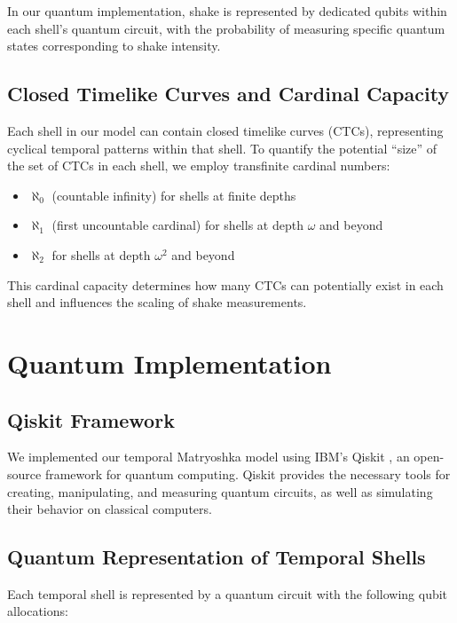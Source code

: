 \documentclass[12pt,a4paper]{article}
\begin{document}
In our quantum implementation, shake is represented by dedicated qubits within each shell's quantum circuit, with the probability of measuring specific quantum states corresponding to shake intensity.

\subsection{Closed Timelike Curves and Cardinal Capacity}

Each shell in our model can contain closed timelike curves (CTCs), representing cyclical temporal patterns within that shell. To quantify the potential ``size'' of the set of CTCs in each shell, we employ transfinite cardinal numbers:

\begin{itemize}
    \item $\aleph_0$ (countable infinity) for shells at finite depths
    \item $\aleph_1$ (first uncountable cardinal) for shells at depth $\omega$ and beyond
    \item $\aleph_2$ for shells at depth $\omega^2$ and beyond
\end{itemize}

This cardinal capacity determines how many CTCs can potentially exist in each shell and influences the scaling of shake measurements.

\section{Quantum Implementation}

\subsection{Qiskit Framework}

We implemented our temporal Matryoshka model using IBM's Qiskit \citep{qiskit}, an open-source framework for quantum computing. Qiskit provides the necessary tools for creating, manipulating, and measuring quantum circuits, as well as simulating their behavior on classical computers.

\subsection{Quantum Representation of Temporal Shells}

Each temporal shell is represented by a quantum circuit with the following qubit allocations:
\end{document}

